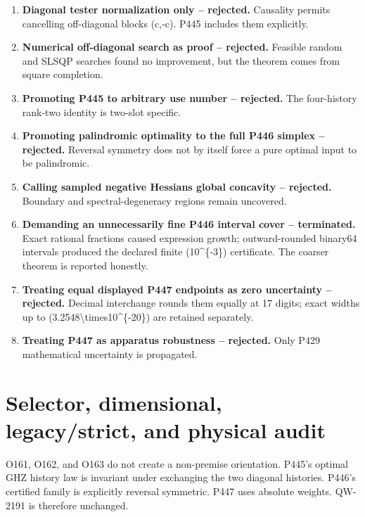 \documentclass[11pt,a4paper,openany]{report}
\begin{document}
\begin{enumerate}
\item 
\textbf{Diagonal tester normalization only -- rejected.} Causality permits cancelling off-diagonal blocks (c,-c). P445 includes them explicitly.

\item 
\textbf{Numerical off-diagonal search as proof -- rejected.} Feasible random and SLSQP searches found no improvement, but the theorem comes from square completion.

\item 
\textbf{Promoting P445 to arbitrary use number -- rejected.} The four-history rank-two identity is two-slot specific.

\item 
\textbf{Promoting palindromic optimality to the full P446 simplex -- rejected.} Reversal symmetry does not by itself force a pure optimal input to be palindromic.

\item 
\textbf{Calling sampled negative Hessians global concavity -- rejected.} Boundary and spectral-degeneracy regions remain uncovered.

\item 
\textbf{Demanding an unnecessarily fine P446 interval cover -- terminated.} Exact rational fractions caused expression growth; outward-rounded binary64 intervals produced the declared finite (10\textasciicircum{}\{-3\}) certificate. The coarser theorem is reported honestly.

\item 
\textbf{Treating equal displayed P447 endpoints as zero uncertainty -- rejected.} Decimal interchange rounds them equally at 17 digits; exact widths up to (3.2548\textbackslash{}times10\textasciicircum{}\{-20\}) are retained separately.

\item 
\textbf{Treating P447 as apparatus robustness -- rejected.} Only P429 mathematical uncertainty is propagated.

\end{enumerate}

\chapter{Selector, dimensional, legacy/\allowbreak{}strict, and physical audit}

O161, O162, and O163 do not create a non-premise orientation. P445's optimal GHZ history law is invariant under exchanging the two diagonal histories. P446's certified family is explicitly reversal symmetric. P447 uses absolute weights. QW-2191 is therefore unchanged.
\end{document}
